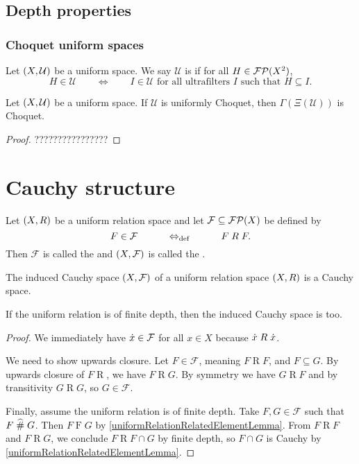 \subsection{Depth properties}
\subsubsection{Choquet uniform spaces}
\begin{definition}
Let $\sSet{X,\mathcal{U}}$ be a uniform space. We say $\mathcal{U}$ is  if for all $H\in \operatorname{\mathcal{FP}}(X^2)$,
\[ H\in\mathcal{U} \qquad\iff\qquad \text{$I \in \mathcal{U}$ for all ultrafilters $I$ such that $H\subseteq I$.} \]
\end{definition}

\begin{lemma}
Let $\sSet{X,\mathcal{U}}$ be a uniform space. If $\mathcal{U}$ is uniformly Choquet, then $\Gamma(\Xi(\mathcal{U}))$ is Choquet.
\end{lemma}
\begin{proof}
????????????????
\end{proof}


\section{Cauchy structure}
\begin{definition}
Let $\sSet{X,R}$ be a uniform relation space and let $\mathcal{F}\subseteq \operatorname{\mathcal{FP}}(X)$ be defined by
\[ F\in \mathcal{F} \qquad\quad\Leftrightarrow_{\text{def}}\quad\qquad F\mathrel{R} F. \]
Then $\mathcal{F}$ is called the  and $\sSet{X,\mathcal{F}}$ is called the .
\end{definition}
\begin{lemma}
The induced Cauchy space $\sSet{X, \mathcal{F}}$ of a uniform relation space $\sSet{X,R}$ is a Cauchy space.

If the uniform relation is of finite depth, then the induced Cauchy space is too.
\end{lemma}
\begin{proof}
We immediately have $\dot{x}\in\mathcal{F}$ for all $x\in X$ because $\dot{x}\mathrel{R} \dot{x}$.

We need to show upwards closure. Let $F\in \mathcal{F}$, meaning $F\mathrel{R} F$, and $F\subseteq G$. By upwards closure of $F\mathrel{R}$, we have $F\mathrel{R} G$. By symmetry we have $G\mathrel{R} F$ and by transitivity $G\mathrel{R} G$, so $G\in\mathcal{F}$.

Finally, assume the uniform relation is of finite depth. Take $F,G\in \mathcal{F}$ such that $F\mathrel{\widehat{\#}} G$. Then $F\mathrel{F}G$ by \ref{uniformRelationRelatedElementLemma}.
From $F\mathrel{R}F$ and $F\mathrel{R}G$, we conclude $F\mathrel{R}F\cap G$ by finite depth, so $F\cap G$ is Cauchy by \ref{uniformRelationRelatedElementLemma}.
\end{proof}

